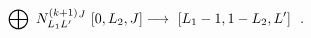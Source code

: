 \begin{equation}\label{mmAflowIV}
\bigoplus_{} \ N^{(k+1)}_{L_{1}L' }{}^{J} \ [0,L_{2},J]
\longrightarrow \ \makebox[5cm][l]{$\displaystyle [L_{1}-1,1-L_{2},L']
\ \ .$}
\end{equation}

